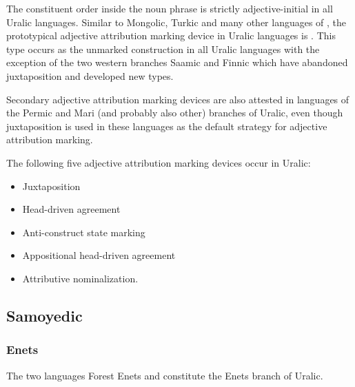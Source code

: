 The constituent order inside the noun phrase is strictly adjective-initial in all Uralic languages. Similar to Mongolic, Turkic and many other languages of , the prototypical adjective attribution marking device in Uralic languages is . This type occurs as the unmarked construction in all Uralic languages with the exception of the two western branches Saamic and Finnic which have abandoned juxtaposition and developed new types.

Secondary adjective attribution marking devices are also attested in languages of the Permic and Mari (and probably also other) branches of Uralic, even though juxtaposition is used in these languages as the default strategy for adjective attribution marking.

The following five adjective attribution marking devices occur in Uralic:
\begin{itemize}
\item Juxtaposition
\item Head\hyp{}driven agreement
\item Anti\hyp{}construct state marking
\item Appositional head\hyp{}driven agreement
\item Attributive nominalization.
\end{itemize}

\subsection{Samoyedic}
\subsubsection{Enets}
The two languages Forest Enets and  constitute the Enets branch of Uralic.

